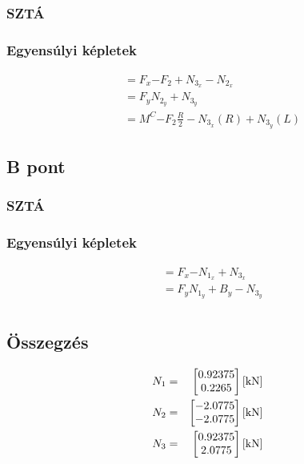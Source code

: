 \newpage

\subsection{}
\subsubsection{SZTÁ}
\subsubsection{Egyensúlyi képletek}
\begin{align}
    &\equal{F_x}{- F_2 + N_{3_x} - N_{2_x}} \\
    &\equal{F_y}{N_{2_y} + N_{3_y}} \\
    &\equal{M^C}{-F_2 \frac{R}{2} - N_{3_x} (R) + N_{3_y} (L)}
\end{align}

\newpage

\subsection{B pont}

\subsubsection{SZTÁ}

\subsubsection{Egyensúlyi képletek}
\begin{align}
    &\equal{F_x}{-N_{1_x} + N_{3_x}} \\
    &\equal{F_y}{N_{1_y} + B_y - N_{3_y}} \\
\end{align}

\newpage

\subsection{Összegzés}
\begin{align*}
	N_1 &= &\begin{bmatrix}
		0.92375 \\
		0.2265
	\end{bmatrix} \SI{}{[\kilo\newton]}\\
	N_2 &= &\begin{bmatrix}
		-2.0775 \\
		-2.0775
	\end{bmatrix} \SI{}{[\kilo\newton]}\\
	N_3 &= &\begin{bmatrix}
		0.92375 \\
		2.0775
	\end{bmatrix} \SI{}{[\kilo\newton]}\\
\end{align*}
